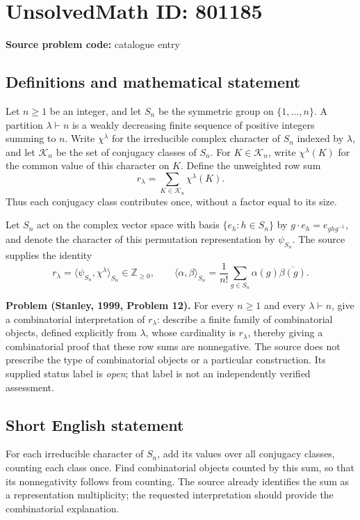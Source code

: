 \documentclass[11pt]{article}
\begin{document}
\section*{UnsolvedMath ID: 801185}
\textbf{Source problem code:} catalogue entry
\subsection{Definitions and mathematical statement}
Let \(n\geq 1\) be an integer, and let \(S_n\) be the symmetric group on \(\{1,\ldots,n\}\). A partition \(\lambda\vdash n\) is a weakly decreasing finite sequence of positive integers summing to \(n\). Write \(\chi^\lambda\) for the irreducible complex character of \(S_n\) indexed by \(\lambda\), and let \(\mathcal K_n\) be the set of conjugacy classes of \(S_n\). For \(K\in\mathcal K_n\), write \(\chi^\lambda(K)\) for the common value of this character on \(K\). Define the unweighted row sum
\[
 r_\lambda=\sum_{K\in\mathcal K_n}\chi^\lambda(K).
\]
Thus each conjugacy class contributes once, without a factor equal to its size.

Let \(S_n\) act on the complex vector space with basis \(\{e_h:h\in S_n\}\) by \(g\cdot e_h=e_{ghg^{-1}}\), and denote the character of this permutation representation by \(\psi_{S_n}\). The source supplies the identity
\[
 r_\lambda=\langle\psi_{S_n},\chi^\lambda\rangle_{S_n}\in\mathbb Z_{\geq0},
 \qquad
 \langle\alpha,\beta\rangle_{S_n}
 =\frac{1}{n!}\sum_{g\in S_n}\alpha(g)\overline{\beta(g)}.
\]

\textbf{Problem (Stanley, 1999, Problem 12).} For every \(n\geq1\) and every \(\lambda\vdash n\), give a combinatorial interpretation of \(r_\lambda\): describe a finite family of combinatorial objects, defined explicitly from \(\lambda\), whose cardinality is \(r_\lambda\), thereby giving a combinatorial proof that these row sums are nonnegative. The source does not prescribe the type of combinatorial objects or a particular construction. Its supplied status label is \emph{open}; that label is not an independently verified assessment.
\subsection{Short English statement}
For each irreducible character of \(S_n\), add its values over all conjugacy classes, counting each class once. Find combinatorial objects counted by this sum, so that its nonnegativity follows from counting. The source already identifies the sum as a representation multiplicity; the requested interpretation should provide the combinatorial explanation.
\end{document}

